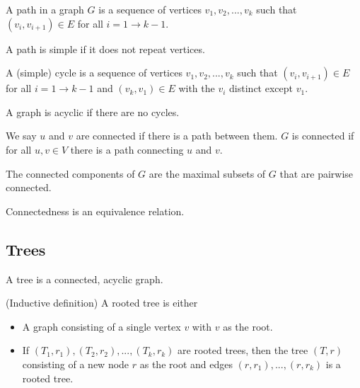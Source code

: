 \begin{definition}
    A path in a graph $G$ is a sequence of vertices $v_1, v_2, ...,
    v_k$ such that $(v_i, v_{i+1}) \in E$ for all $i = 1 \to k - 1$.
\end{definition}

\begin{definition}
    A path is simple if it does not repeat vertices.
\end{definition}

\begin{definition}
    A (simple) cycle is a sequence of vertices $v_1, v_2, ...,
    v_k$ such that $(v_i, v_{i+1}) \in E$ for all $i = 1 \to k -
    1$ and $(v_k, v_1) \in E$ with the $v_i$ distinct except $v_1$.
\end{definition}

\begin{definition}
    A graph is acyclic if there are no cycles.
\end{definition}

\begin{definition}
    We say $u$ and $v$ are connected if there is a path between them.
    $G$ is connected if for all $u, v \in V$ there is a path
    connecting $u$ and $v$.
\end{definition}

\begin{definition}
    The connected components of $G$ are the maximal subsets of $G$
    that are pairwise connected.
\end{definition}

\begin{remark}
    Connectedness is an equivalence relation.
\end{remark}

\subsection{Trees}

\begin{definition}
    A tree is a connected, acyclic graph.
\end{definition}

\begin{definition}
    (Inductive definition) A rooted tree is either
    \begin{itemize}
        \item A graph consisting of a single vertex $v$ with $v$ as
        the root.
        \item If $(T_1, r_1), (T_2, r_2), ..., (T_k, r_k)$ are rooted
        trees, then the tree $(T, r)$ consisting of a new node $r$ as
        the root and edges $(r, r_1), ..., (r, r_k)$ is a rooted tree.
    \end{itemize}
\end{definition}

